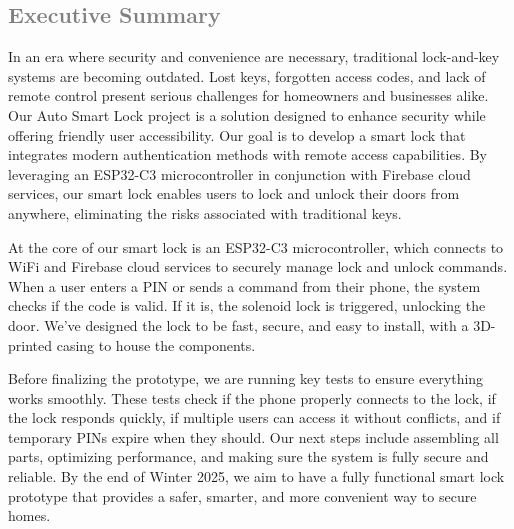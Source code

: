 \subsection{\textcolor{gray}{Executive Summary}}

In an era where security and convenience are necessary, traditional lock-and-key systems are becoming outdated. Lost keys, forgotten access codes, and lack of remote control present serious challenges for homeowners and businesses alike. Our Auto Smart Lock project is a solution designed to enhance security while offering friendly user accessibility.
\newline
Our goal is to develop a smart lock that integrates modern authentication methods with remote access capabilities. By leveraging an ESP32-C3 microcontroller in conjunction with Firebase cloud services, our smart lock enables users to lock and unlock their doors from anywhere, eliminating the risks associated with traditional keys.
\newline

At the core of our smart lock is an ESP32-C3 microcontroller, which connects to WiFi and Firebase cloud services to securely manage lock and unlock commands. When a user enters a PIN or sends a command from their phone, the system checks if the code is valid. If it is, the solenoid lock is triggered, unlocking the door. We’ve designed the lock to be fast, secure, and easy to install, with a 3D-printed casing to house the components.
\newline

Before finalizing the prototype, we are running key tests to ensure everything works smoothly. These tests check if the phone properly connects to the lock, if the lock responds quickly, if multiple users can access it without conflicts, and if temporary PINs expire when they should. Our next steps include assembling all parts, optimizing performance, and making sure the system is fully secure and reliable. By the end of Winter 2025, we aim to have a fully functional smart lock prototype that provides a safer, smarter, and more convenient way to secure homes.